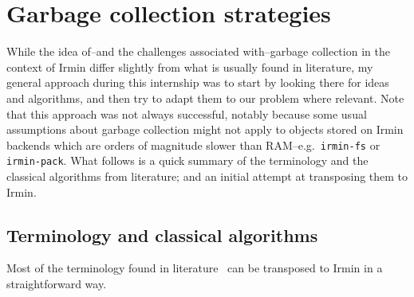 \section{Garbage collection strategies}

While the idea of--and the challenges associated with--garbage collection in the context of Irmin differ slightly from what is usually found in literature, my general approach during this internship was to start by looking there for ideas and algorithms, and then try to adapt them to our problem where relevant. Note that this approach was not always successful, notably because some usual assumptions about garbage collection might not apply to objects stored on Irmin backends which are orders of magnitude slower than RAM--e.g.~\texttt{irmin-fs} or \texttt{irmin-pack}. What follows is a quick summary of the terminology and the classical algorithms from literature; and an initial attempt at transposing them to Irmin.

\subsection{Terminology and classical algorithms}

Most of the terminology found in literature~\cite{handbook} can be transposed to Irmin in a straightforward way.

